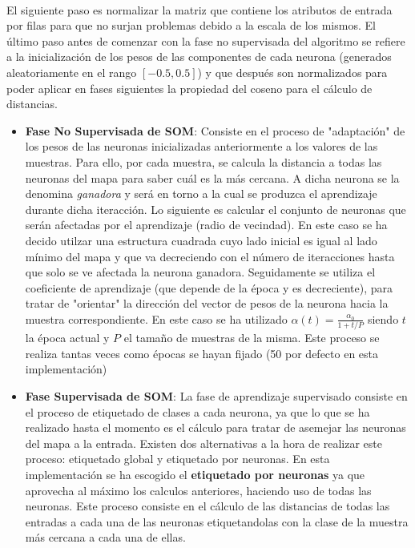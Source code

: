 \documentclass[10pt, a4paper,spanish]{article}
\begin{document}
			\paragraph{}
			El siguiente paso es normalizar la matriz que contiene los atributos de entrada por filas para que no surjan problemas debido a la escala de los mismos. El último paso antes de comenzar con la fase no supervisada del algoritmo se refiere a la inicialización de los pesos de las componentes de cada neurona (generados aleatoriamente en el rango $[-0.5, 0.5]$) y que después son normalizados para poder aplicar en fases siguientes la propiedad del coseno para el cálculo de distancias.

			\begin{itemize}

				\item \textbf{Fase No Supervisada de SOM}: Consiste en el proceso de "adaptación" de los pesos de las neuronas inicializadas anteriormente a los valores de las muestras. Para ello, por cada muestra, se calcula la distancia a todas las neuronas del mapa para saber cuál es la más cercana. A dicha neurona se la denomina \emph{ganadora} y será en torno a la cual se produzca el aprendizaje durante dicha iteracción. Lo siguiente es calcular el conjunto de neuronas que serán afectadas por el aprendizaje (radio de vecindad). En este caso se ha decido utilzar una estructura cuadrada cuyo lado inicial es igual al lado mínimo del mapa y que va decreciendo con el número de iteracciones hasta que solo se ve afectada la neurona ganadora. Seguidamente se utiliza el coeficiente de aprendizaje (que depende de la época y es decreciente), para tratar de "orientar" la dirección del vector de pesos de la neurona hacia la muestra correspondiente. En este caso se ha utilizado $\alpha(t) =  \frac{\alpha_0}{1 + t/P}$ siendo $t$ la época actual y $P$ el tamaño de muestras de la misma. Este proceso se realiza tantas veces como épocas se hayan fijado (50 por defecto en esta implementación)


				\item \textbf{Fase Supervisada de SOM}: La fase de aprendizaje supervisado consiste en el proceso de etiquetado de clases a cada neurona, ya que lo que se ha realizado hasta el momento es el cálculo para tratar de asemejar las neuronas del mapa a la entrada. Existen dos alternativas a la hora de realizar este proceso: etiquetado global y etiquetado por neuronas. En esta implementación se ha escogido el \textbf{etiquetado por neuronas} ya que aprovecha al máximo los calculos anteriores, haciendo uso de todas las neuronas. Este proceso consiste en el cálculo de las distancias de todas las entradas a cada una de las neuronas etiquetandolas con la clase de la muestra más cercana a cada una de ellas.

			\end{itemize}
\end{document}
